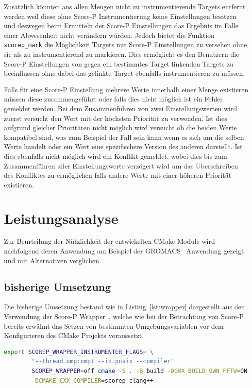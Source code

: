 \documentclass[german,proseminar,hyperref,utf8,lof]{zihpub}
\begin{document}
    Zusätzlich könnten aus allen Mengen nicht zu instrumentierende Targets entfernt werden weil
    diese ohne Score-P Instrumentierung keine Einstellungen besitzen und deswegen beim Ermitteln
    der Score-P Einstellungen das Ergebnis im Falle einer Abwesenheit nicht verändern würden.
    Jedoch bietet die Funktion \texttt{scorep\_mark} die Möglichkeit Targets mit Score-P Einstellungen
    zu versehen ohne sie als zu instrumentierend zu markieren.
    Dies ermöglicht es den Benutzern die Score-P Einstellungen von gegen ein bestimmtes Target linkenden
    Targets zu beeinflussen ohne dabei das gelinkte Target ebenfalls instrumentieren zu müssen.

    Falls für eine Score-P Einstellung mehrere Werte innerhalb einer Menge existieren müssen diese
    zusammengeführt oder falls dies nicht möglich ist ein Fehler gemeldet werden.
    Bei dem Zusammenführen von zwei Einstellungswerten wird zuerst versucht den Wert mit der höchsten
    Priorität zu verwenden.
    Ist dies aufgrund gleicher Prioritäten nicht möglich wird versucht ob die beiden Werte kompatibel
    sind, was zum Beispiel der Fall sein kann wenn es sich um die selben Werte handelt oder ein
    Wert eine spezifischere Version des anderen darstellt.
    Ist dies ebenfalls nicht möglich wird ein Konflikt gemeldet, wobei dies bis zum Zusammenführen
    aller Einstellungswerte verzögert wird um das Überschreiben des Konfliktes zu ermöglichen falls
    andere Werte mit einer höheren Priorität existieren.


    \newpage
    \section{Leistungsanalyse}
    Zur Beurteilung der Nützlichkeit der entwickelten CMake Module wird nachfolgend deren Anwendung
    am Beispiel der GROMACS~\cite{gromacs} Anwendung gezeigt und mit Alternativen verglichen.

    \subsection{bisherige Umsetzung}
    Die bisherige Umsetzung bestand wie in Listing~\ref{lst:wrapper} dargestellt aus der Verwendung der
    Score-P Wrapper~, welche wie bei
    der Betrachtung von Score-P bereits erwähnt das Setzen von bestimmten Umgebungsvariablen vor dem
    Konfigurieren des CMake Projekts voraussetzt.

    \begin{lstlisting}[caption=Anwendung eines Score-P Wrapper bei GROMACS, language=bash, gobble=8, label=lst:wrapper]
        export SCOREP_WRAPPER_INSTRUMENTER_FLAGS= \
        "--thread=omp:ompt --io=posix --compiler"
        SCOREP_WRAPPER=off cmake -S . -B build -DGMX_BUILD_OWN_FFTW=ON \
        -DCMAKE_CXX_COMPILER=scorep-clang++
    \end{lstlisting}
\end{document}
